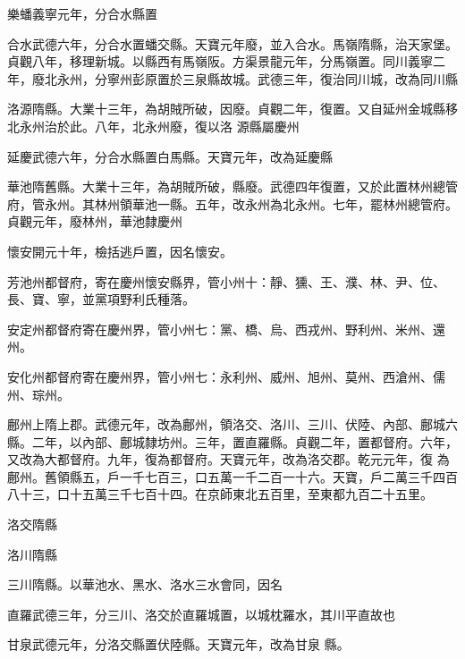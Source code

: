 \begin{pinyinscope}
 樂蟠義寧元年，分合水縣置



 合水武德六年，分合水置蟠交縣。天寶元年廢，並入合水。馬嶺隋縣，治天家堡。貞觀八年，移理新城。以縣西有馬嶺阪。方渠景龍元年，分馬嶺置。同川義寧二年，廢北永州，分寧州彭原置於三泉縣故城。武德三年，復治同川城，改為同川縣



 洛源隋縣。大業十三年，為胡賊所破，因廢。貞觀二年，復置。又自延州金城縣移北永州治於此。八年，北永州廢，復以洛
 源縣屬慶州



 延慶武德六年，分合水縣置白馬縣。天寶元年，改為延慶縣



 華池隋舊縣。大業十三年，為胡賊所破，縣廢。武德四年復置，又於此置林州總管府，管永州。其林州領華池一縣。五年，改永州為北永州。七年，罷林州總管府。貞觀元年，廢林州，華池隸慶州



 懷安開元十年，檢括逃戶置，因名懷安。



 芳池州都督府，寄在慶州懷安縣界，管小州十：靜、獯、王、濮、林、尹、位、長、寶、寧，並黨項野利氏種落。



 安定州都督府寄在慶州界，管小州七：黨、橋、烏、西戎州、野利州、米州、還州。



 安化州都督府寄在慶州界，管小州七：永利州、威州、旭州、莫州、西滄州、儒州、琮州。



 鄜州上隋上郡。武德元年，改為鄜州，領洛交、洛川、三川、伏陸、內部、鄜城六縣。二年，以內部、鄜城隸坊州。三年，置直羅縣。貞觀二年，置都督府。六年，又改為大都督府。九年，復為都督府。天寶元年，改為洛交郡。乾元元年，復
 為鄜州。舊領縣五，戶一千七百三，口五萬一千二百一十六。天寶，戶二萬三千四百八十三，口十五萬三千七百十四。在京師東北五百里，至東都九百二十五里。



 洛交隋縣



 洛川隋縣



 三川隋縣。以華池水、黑水、洛水三水會同，因名



 直羅武德三年，分三川、洛交於直羅城置，以城枕羅水，其川平直故也



 甘泉武德元年，分洛交縣置伏陸縣。天寶元年，改為甘泉
 縣。




\end{pinyinscope}

